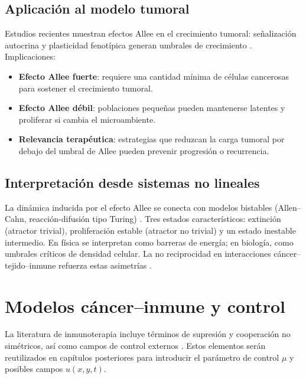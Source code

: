 \subsection{Aplicación al modelo tumoral}
Estudios recientes muestran efectos Allee en el crecimiento tumoral: señalización autocrina y plasticidad fenotípica generan umbrales de crecimiento \cite{gerlee_autocrine_2022,bottger_emerging_2015}. Implicaciones:
\begin{itemize}
  \item \textbf{Efecto Allee fuerte}: requiere una cantidad mínima de células cancerosas para sostener el crecimiento tumoral.
  \item \textbf{Efecto Allee débil}: poblaciones pequeñas pueden mantenerse latentes y proliferar si cambia el microambiente.
  \item \textbf{Relevancia terapéutica}: estrategias que reduzcan la carga tumoral por debajo del umbral de Allee pueden prevenir progresión o recurrencia.
\end{itemize}

\subsection{Interpretación desde sistemas no lineales}
La dinámica inducida por el efecto Allee se conecta con modelos bistables (Allen--Cahn, reacción-difusión tipo Turing) \cite{turing_chemical_1952,bellomo_multiscale_2008}. Tres estados característicos: extinción (atractor trivial), proliferación estable (atractor no trivial) y un estado inestable intermedio. En física se interpretan como barreras de energía; en biología, como umbrales críticos de densidad celular. La no reciprocidad en interacciones cáncer--tejido--inmune refuerza estas asimetrías \cite{delitala_mathematical_2007,gatenby_role_2004,fruchart2021}.

\section{Modelos cáncer--inmune y control}
La literatura de inmunoterapia incluye términos de supresión y cooperación no simétricos, así como campos de control externos \cite{delitala_mathematical_2007,enderling2014,chaplain2006}. Estos elementos serán reutilizados en capítulos posteriores para introducir el parámetro de control $\mu$ y posibles campos $u(x,y,t)$.



















